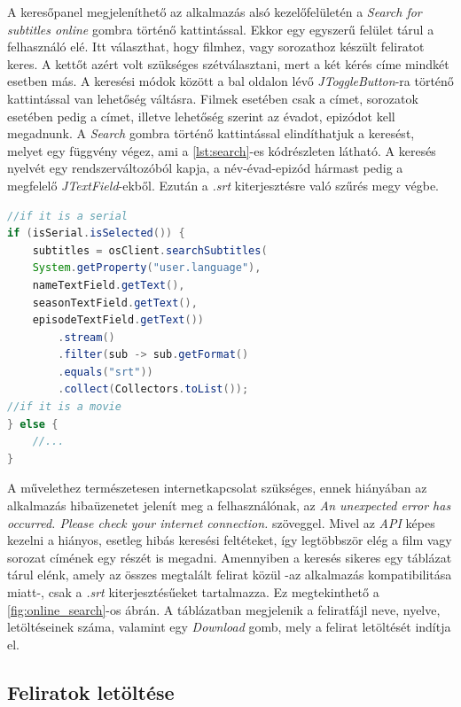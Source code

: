 A keresőpanel megjeleníthető az alkalmazás alsó kezelőfelületén a \textit{Search for subtitles online} gombra történő kattintással. Ekkor egy egyszerű felület tárul a felhasználó elé. Itt választhat, hogy filmhez, vagy sorozathoz készült feliratot keres. A kettőt azért volt szükséges szétválasztani, mert a két kérés címe mindkét esetben más. A keresési módok között a bal oldalon lévő \textit{JToggleButton}-ra történő kattintással van lehetőség váltásra. Filmek esetében csak a címet, sorozatok esetében pedig a címet, illetve lehetőség szerint az évadot, epizódot kell megadnunk. A \textit{Search} gombra történő kattintással elindíthatjuk a keresést, melyet egy függvény végez, ami a \ref{lst:search}-es kódrészleten látható. A keresés nyelvét egy rendszerváltozóból kapja, a név-évad-epizód hármast pedig a megfelelő \textit{JTextField}-ekből. Ezután a \textit{.srt} kiterjesztésre való szűrés megy végbe. 

\begin{spacing}{1.25}
\begin{lstlisting}[caption=Feliratok keresése sorozatokhoz valamint filmekhez, label={lst:search}, language=java]
//if it is a serial
if (isSerial.isSelected()) {
    subtitles = osClient.searchSubtitles(
    System.getProperty("user.language"),
    nameTextField.getText(),
    seasonTextField.getText(),
    episodeTextField.getText())
        .stream()
        .filter(sub -> sub.getFormat()
        .equals("srt"))
        .collect(Collectors.toList());
//if it is a movie
} else {
    //...
}
\end{lstlisting}
\end{spacing}

A művelethez természetesen internetkapcsolat szükséges, ennek hiányában az alkalmazás hibaüzenetet jelenít meg a felhasználónak, az \textit{An unexpected error has occurred. Please check your internet connection.} szöveggel. Mivel az \textit{API} képes kezelni a hiányos, esetleg hibás keresési feltéteket, így legtöbbször elég a film vagy sorozat címének egy részét is megadni. Amennyiben a keresés sikeres egy táblázat tárul elénk, amely az összes megtalált felirat közül -az alkalmazás kompatibilitása miatt-, csak a \textit{.srt} kiterjesztésűeket tartalmazza. Ez megtekinthető a \ref{fig:online_search}-os ábrán. A táblázatban megjelenik a feliratfájl neve, nyelve, letöltéseinek száma, valamint egy \textit{Download} gomb, mely a felirat letöltését indítja el.

\subsection{Feliratok letöltése}


